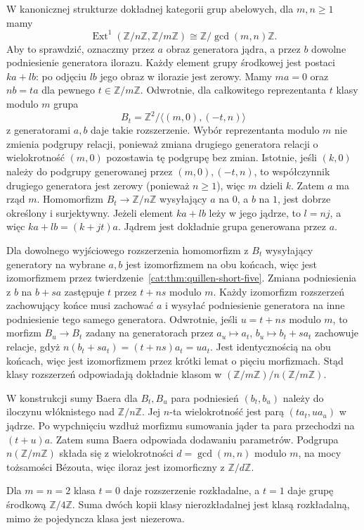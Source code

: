 \begin{przyklad}\label{cat:ex:quillen-cyclic-extensions}
W kanonicznej strukturze dokładnej kategorii grup abelowych, dla $m,n\geq1$ mamy
\[
 \operatorname{Ext}^1(\mathbb Z/n\mathbb Z,\mathbb Z/m\mathbb Z)
 \cong \mathbb Z/\gcd(m,n)\mathbb Z.
\]
Aby to sprawdzić, oznaczmy przez $a$ obraz generatora jądra, a przez $b$ dowolne podniesienie generatora ilorazu. Każdy element grupy środkowej jest postaci $ka+lb$: po odjęciu $lb$ jego obraz w ilorazie jest zerowy. Mamy $ma=0$ oraz $nb=ta$ dla pewnego $t\in\mathbb Z/m\mathbb Z$. Odwrotnie, dla całkowitego reprezentanta $t$ klasy modulo $m$ grupa
\[
 B_t=\mathbb Z^2/\langle(m,0),(-t,n)\rangle
\]
z generatorami $a,b$ daje takie rozszerzenie. Wybór reprezentanta modulo $m$ nie zmienia podgrupy relacji, ponieważ zmiana drugiego generatora relacji o wielokrotność $(m,0)$ pozostawia tę podgrupę bez zmian. Istotnie, jeśli $(k,0)$ należy do podgrupy generowanej przez $(m,0),(-t,n)$, to współczynnik drugiego generatora jest zerowy (ponieważ $n\geq1$), więc $m$ dzieli $k$. Zatem $a$ ma rząd $m$. Homomorfizm $B_t\to\mathbb Z/n\mathbb Z$ wysyłający $a$ na $0$, a $b$ na $1$, jest dobrze określony i surjektywny. Jeżeli element $ka+lb$ leży w jego jądrze, to $l=nj$, a więc $ka+lb=(k+jt)a$. Jądrem jest dokładnie grupa generowana przez $a$.

Dla dowolnego wyjściowego rozszerzenia homomorfizm z $B_t$ wysyłający generatory na wybrane $a,b$ jest izomorfizmem na obu końcach, więc jest izomorfizmem przez twierdzenie~\ref{cat:thm:quillen-short-five}. Zmiana podniesienia z $b$ na $b+sa$ zastępuje $t$ przez $t+ns$ modulo $m$. Każdy izomorfizm rozszerzeń zachowujący końce musi zachować $a$ i wysyłać podniesienie generatora na inne podniesienie tego samego generatora. Odwrotnie, jeśli $u=t+ns$ modulo $m$, to morfizm $B_u\to B_t$ zadany na generatorach przez $a_u\mapsto a_t$, $b_u\mapsto b_t+sa_t$ zachowuje relacje, gdyż $n(b_t+sa_t)=(t+ns)a_t=ua_t$. Jest identycznością na obu końcach, więc jest izomorfizmem przez krótki lemat o pięciu morfizmach. Stąd klasy rozszerzeń odpowiadają dokładnie klasom w $(\mathbb Z/m\mathbb Z)/n(\mathbb Z/m\mathbb Z)$.

W konstrukcji sumy Baera dla $B_t,B_u$ para podniesień $(b_t,b_u)$ należy do iloczynu włóknistego nad $\mathbb Z/n\mathbb Z$. Jej $n$-ta wielokrotność jest parą $(ta_t,ua_u)$ w jądrze. Po wypchnięciu wzdłuż morfizmu sumowania jąder ta para przechodzi na $(t+u)a$. Zatem suma Baera odpowiada dodawaniu parametrów. Podgrupa $n(\mathbb Z/m\mathbb Z)$ składa się z wielokrotności $d=\gcd(m,n)$ modulo $m$, na mocy tożsamości Bézouta, więc iloraz jest izomorficzny z $\mathbb Z/d\mathbb Z$.

Dla $m=n=2$ klasa $t=0$ daje rozszerzenie rozkładalne, a $t=1$ daje grupę środkową $\mathbb Z/4\mathbb Z$. Suma dwóch kopii klasy nierozkładalnej jest klasą rozkładalną, mimo że pojedyncza klasa jest niezerowa.
\end{przyklad}

